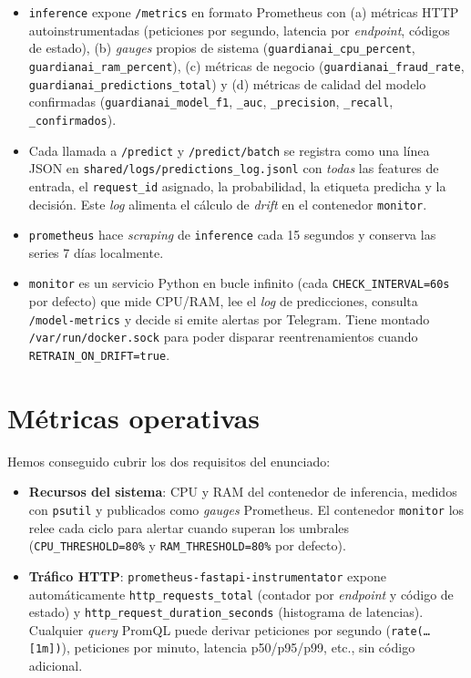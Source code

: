 \documentclass[12pt,a4paper]{report}
\begin{document}
\begin{itemize}
    \item \texttt{inference} expone \texttt{/metrics} en formato Prometheus con (a) métricas HTTP autoinstrumentadas (peticiones por segundo, latencia por \textit{endpoint}, códigos de estado), (b) \textit{gauges} propios de sistema (\texttt{guardianai\_cpu\_percent}, \texttt{guardianai\_ram\_percent}), (c) métricas de negocio (\texttt{guardianai\_fraud\_rate}, \texttt{guardianai\_predictions\_total}) y (d) métricas de calidad del modelo confirmadas (\texttt{guardianai\_model\_f1}, \texttt{\_auc}, \texttt{\_precision}, \texttt{\_recall}, \texttt{\_confirmados}).
    \item Cada llamada a \texttt{/predict} y \texttt{/predict/batch} se registra como una línea JSON en \texttt{shared/logs/predictions\_log.jsonl} con \textit{todas} las features de entrada, el \texttt{request\_id} asignado, la probabilidad, la etiqueta predicha y la decisión. Este \textit{log} alimenta el cálculo de \textit{drift} en el contenedor \texttt{monitor}.
    \item \texttt{prometheus} hace \textit{scraping} de \texttt{inference} cada 15 segundos y conserva las series 7 días localmente.
    \item \texttt{monitor} es un servicio Python en bucle infinito (cada \texttt{CHECK\_INTERVAL=60s} por defecto) que mide CPU/RAM, lee el \textit{log} de predicciones, consulta \texttt{/model-metrics} y decide si emite alertas por Telegram. Tiene montado \texttt{/var/run/docker.sock} para poder disparar reentrenamientos cuando \texttt{RETRAIN\_ON\_DRIFT=true}.
\end{itemize}

\section{Métricas operativas}
\label{sec:hito5-operativas}

Hemos conseguido cubrir los dos requisitos del enunciado:

\begin{itemize}
    \item \textbf{Recursos del sistema}: CPU y RAM del contenedor de inferencia, medidos con \texttt{psutil} y publicados como \textit{gauges} Prometheus. El contenedor \texttt{monitor} los relee cada ciclo para alertar cuando superan los umbrales (\texttt{CPU\_THRESHOLD=80\%} y \texttt{RAM\_THRESHOLD=80\%} por defecto).
    \item \textbf{Tráfico HTTP}: \texttt{prometheus-fastapi-instrumentator} expone automáticamente \texttt{http\_requests\_total} (contador por \textit{endpoint} y código de estado) y \texttt{http\_request\_duration\_seconds} (histograma de latencias). Cualquier \textit{query} PromQL puede derivar peticiones por segundo (\texttt{rate(\dots[1m])}), peticiones por minuto, latencia p50/p95/p99, etc., sin código adicional.
\end{itemize}
\end{document}

